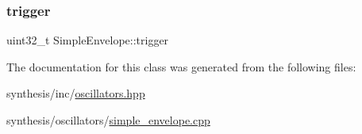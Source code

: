 \subsubsection{\texorpdfstring{trigger}{trigger}}
{\footnotesize\ttfamily uint32\+\_\+t Simple\+Envelope\+::trigger}



The documentation for this class was generated from the following files\+:\begin{DoxyCompactItemize}
\item 
synthesis/inc/\mbox{\hyperlink{oscillators_8hpp}{oscillators.\+hpp}}\item 
synthesis/oscillators/\mbox{\hyperlink{simple__envelope_8cpp}{simple\+\_\+envelope.\+cpp}}\end{DoxyCompactItemize}
